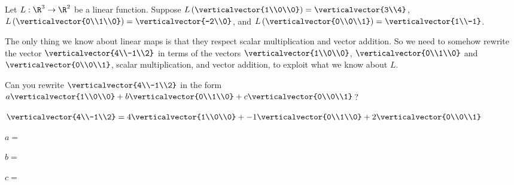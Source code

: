 \documentclass{ximera}
\begin{document}
\begin{question}
  Let $L:\R^3 \to \R^2$ be a linear function.  Suppose
  $L\left(\verticalvector{1\\0\\0}\right) = \verticalvector{3\\4}$,
  $L\left(\verticalvector{0\\1\\0}\right) = \verticalvector{-2\\0}$,
  and $L\left(\verticalvector{0\\0\\1}\right) =
  \verticalvector{1\\-1}$.
  
  \begin{solution}
  
  	\begin{hint}	
  		The only thing we know about linear maps is that they respect scalar multiplication and vector addition.  So we need to somehow rewrite the vector
  		$\verticalvector{4\\-1\\2}$ in terms of the vectors $\verticalvector{1\\0\\0}$, $\verticalvector{0\\1\\0}$ and $\verticalvector{0\\0\\1}$, scalar multiplication,
  		and vector addition, to exploit what we know about $L$.
  		
  		
  		
  		\begin{question}
  			Can you rewrite $\verticalvector{4\\-1\\2}$ in the form $a\verticalvector{1\\0\\0}+b\verticalvector{0\\1\\0}+c\verticalvector{0\\0\\1}$?
  			\begin{solution}
  				\begin{hint}
  					$\verticalvector{4\\-1\\2} = 4\verticalvector{1\\0\\0}+-1\verticalvector{0\\1\\0}+2\verticalvector{0\\0\\1}$
  				\end{hint}
  				$a =$ 
  			\end{solution}
  			\begin{solution}
  				$b=$ \answer{-1}
  			\end{solution}
  			\begin{solution}
  				$c=$ \answer{2}
  			\end{solution}
  		\end{question}
  		

\end{hint}
\end{solution}
\end{question}
\end{document}
